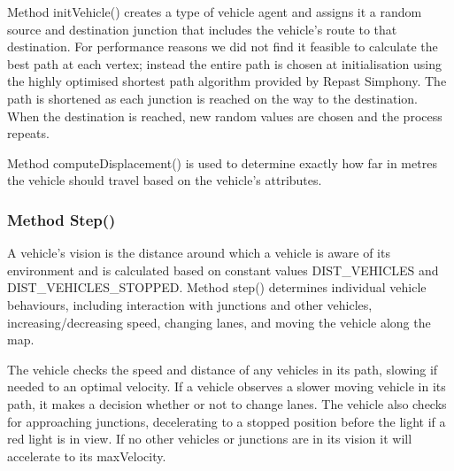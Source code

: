 \documentclass[11pt]{article}
\begin{document}
Method initVehicle() creates a type of vehicle agent and assigns it a random source and destination junction that includes the vehicle\textquoteright s route to that destination. For performance reasons we did not find it feasible to calculate the best path at each vertex; instead the entire path is chosen at initialisation using the highly optimised shortest path algorithm provided by Repast Simphony. The path is shortened as each junction is reached on the way to the destination. When the destination is reached, new random values are chosen and the process repeats.

Method computeDisplacement() is used to determine exactly how far in metres the vehicle should travel based on the vehicle\textquoteright s attributes. 


\subsubsection{Method Step()}


A vehicle\textquoteright s vision is the distance around which a vehicle is aware of its environment and is calculated based on constant values DIST{\_}VEHICLES and DIST{\_}VEHICLES{\_}STOPPED. Method step() determines individual vehicle behaviours, including interaction with junctions and other vehicles, increasing/decreasing speed, changing lanes, and moving the vehicle along the map.

The vehicle checks the speed and distance of any vehicles in its path, slowing if needed to an optimal velocity. If a vehicle observes a slower moving vehicle in its path, it makes a decision whether or not to change lanes. The vehicle also checks for approaching junctions, decelerating to a stopped position before the light if a red light is in view. If no other vehicles or junctions are in its vision it will accelerate to its maxVelocity. 
\\
\end{document}
